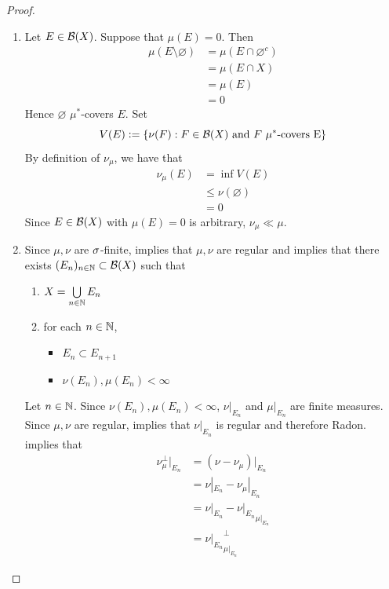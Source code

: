 \documentclass{book}
\begin{document}
	\begin{proof}\
		\begin{enumerate}
			\item Let $E \in \mathcal{B}(X)$. Suppose that $\mu(E) = 0$. Then 
			\begin{align*}
				\mu(E \setminus \varnothing)
				& = \mu(E \cap \varnothing^c) \\
				& = \mu(E \cap X) \\
				& = \mu(E) \\
				& = 0
			\end{align*}
			Hence $\varnothing$ $\mu^*$-covers $E$. Set 
			$$V(E) \vcentcolon= \{\nu(F): F \in \mathcal{B}(X) \text{ and $F$ $\mu^*$-covers E}\}$$ 
			By definition of $\nu_{\mu}$, we have that 
			\begin{align*}
				\nu_{\mu}(E)
				& = \inf V(E) \\
				& \leq \nu(\varnothing) \\
				& = 0
			\end{align*}
			Since $E \in \mathcal{B}(X)$ with $\mu(E) = 0$ is arbitrary, $\nu_{\mu} \ll \mu$.
			\item Since $\mu,\nu$ are $\sigma$-finite,  implies that $\mu, \nu$ are regular and  implies that there exists $(E_n)_{n \in \mathbb{N}} \subset \mathcal{B}(X)$ such that 
			\begin{enumerate}
				\item $X = \bigcup\limits_{n \in \mathbb{N}} E_n$
				\item for each $n \in \mathbb{N}$,
				\begin{itemize}
					\item $E_n \subset E_{n+1}$ 
					\item $\nu(E_n), \mu(E_n) < \infty$
				\end{itemize}
			\end{enumerate} 
			Let $n \in \mathbb{N}$. Since $\nu(E_n), \mu(E_n) < \infty$, $\nu|_{E_n}$ and $\mu|_{E_n}$ are finite measures. Since $\mu,\nu$ are regular,  implies that $\nu|_{E_n}$ is regular and therefore Radon.   implies that 
			\begin{align*}
				\nu_{\mu}^{\perp}|_{E_n} 
				& = (\nu - \nu_{\mu})|_{E_n} \\
				& = \nu|_{E_n} - \nu_{\mu}|_{E_n} \\
				& = \nu|_{E_n} - {\nu|_{E_n}}_{\mu|_{E_n}} \\
				& = {\nu|_{E_n}}_{\mu|_{E_n}}^{\perp}
			\end{align*}

\end{enumerate}
\end{proof}
\end{document}
